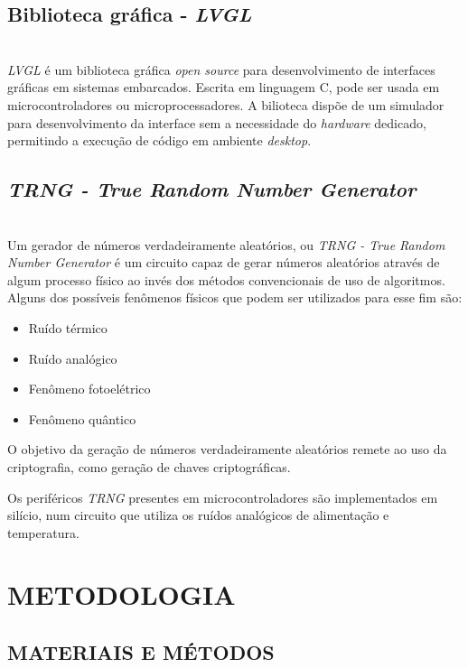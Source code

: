 \documentclass[times, twoside, watermark]{artigo}
\begin{document}
\subsection{Biblioteca gráfica - \textit{LVGL}}\hfill\\

\textit{LVGL} é um biblioteca gráfica \textit{open source} para desenvolvimento
de interfaces gráficas em sistemas embarcados. Escrita em linguagem C, pode ser usada 
em microcontroladores ou microprocessadores. 
A bilioteca dispõe de um simulador para desenvolvimento da interface sem 
a necessidade do \textit{hardware} dedicado, permitindo a execução de código em
ambiente \textit{desktop}.\cite{lvgl}

\subsection{\textit{TRNG - True Random Number Generator}}\hfill\\

Um gerador de números verdadeiramente aleatórios, ou \textit{TRNG - True Random 
Number Generator} é um circuito capaz de gerar números aleatórios através
de algum processo físico ao invés dos métodos convencionais de uso de algoritmos.
Alguns dos possíveis fenômenos físicos que podem ser utilizados para esse fim são:
\begin{itemize}
  \item Ruído térmico
  \item Ruído analógico
  \item Fenômeno fotoelétrico
  \item Fenômeno quântico
\end{itemize}

O objetivo da geração de números verdadeiramente aleatórios remete ao uso da 
criptografia, como geração de chaves criptográficas.

Os periféricos \textit{TRNG} presentes em microcontroladores são 
implementados em silício, num circuito que utiliza os ruídos analógicos de 
alimentação e temperatura.\cite{vasyltsov2008fast}

\section{METODOLOGIA}

\subsection{MATERIAIS E MÉTODOS}\hfill\\
\end{document}
